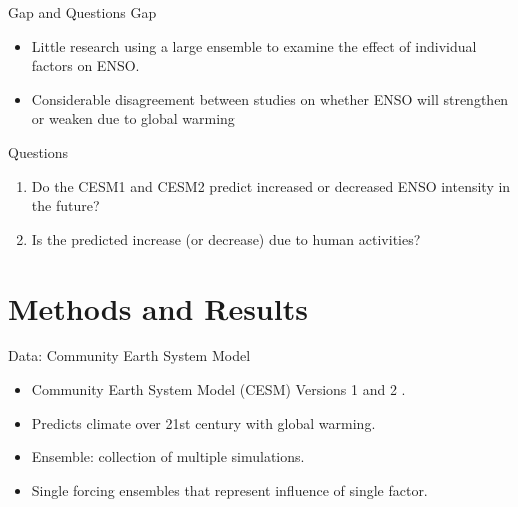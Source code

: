 \documentclass{beamer}
\begin{document}
\begin{frame}{Gap and Questions}
  \alert{Gap}
  \begin{itemize}
  \item Little research using a large ensemble to examine the effect of individual factors on ENSO.
  \item Considerable disagreement between studies on whether ENSO will strengthen or weaken due to global warming
  \end{itemize}
  \alert{Questions}
  \begin{enumerate}
  \item Do the CESM1 and CESM2 predict increased or decreased ENSO intensity in the future?
  \item Is the predicted increase (or decrease) due to human activities?
  \end{enumerate}
\end{frame}

\section{Methods and Results}

\begin{frame}{Data: Community Earth System Model}
  \begin{itemize}
  \item Community Earth System Model (CESM) Versions 1 and 2 \citep{kay2015community} \citep{danabasoglu2020community}.
  \item Predicts climate over 21st century with global warming.
  \item Ensemble: collection of multiple simulations.
  \item Single forcing ensembles that represent influence of single factor.
  \end{itemize}
\end{frame}
\end{document}
